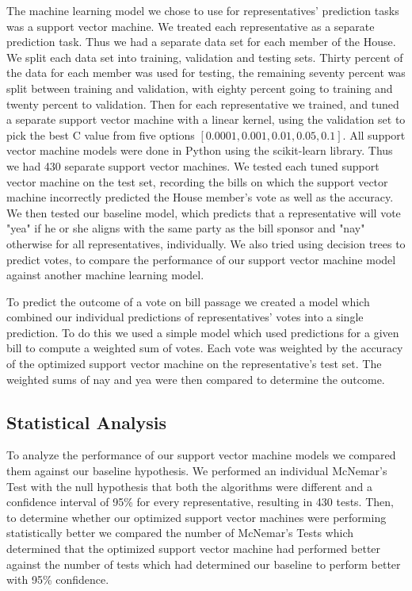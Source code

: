 \documentclass[11pt,letterpaper,twocolumn]{article}
\begin{document}
The machine learning model we chose to use for representatives' prediction tasks was a support vector machine. We treated each representative as a separate prediction task. Thus we had a separate data set for each member of the House. We split each data set into training, validation and testing sets. Thirty percent of the data for each member was used for testing, the remaining seventy percent was split between training and validation, with eighty percent going to training and twenty percent to validation. Then for each representative we trained, and tuned a separate support vector machine with a linear kernel, using the validation set to pick the best C value from five options $[0.0001, 0.001, 0.01, 0.05, 0.1]$. All support vector machine models were done in Python using the scikit-learn library. Thus we had 430 separate support vector machines. We tested each tuned support vector machine on the test set, recording the bills on which the support vector machine incorrectly predicted the House member's vote as well as the accuracy. We then tested our baseline model, which predicts that a representative will vote "yea" if he or she aligns with the same party as the bill sponsor and "nay" otherwise for all representatives, individually. We also tried using decision trees to predict votes, to compare the performance of our support vector machine model against another machine learning model.

To predict the outcome of a vote on bill passage we created a model which combined our individual predictions of representatives' votes into a single prediction. To do this we used a simple model which used predictions for a given bill to compute a weighted sum of votes. Each vote was weighted by the accuracy of the optimized support vector machine on the representative's test set. The weighted sums of nay and yea were then compared to determine the outcome.

\subsection{Statistical Analysis}

To analyze the performance of our support vector machine models we compared them against our baseline hypothesis. We performed an individual McNemar's Test with the null hypothesis that both the algorithms were different and a confidence interval of 95\% for every representative, resulting in 430 tests. Then, to determine whether our optimized support vector machines were performing statistically better we compared the number of McNemar's Tests which determined that the optimized support vector machine had performed better against the number of tests which had determined our baseline to perform better with 95\% confidence.
\end{document}
